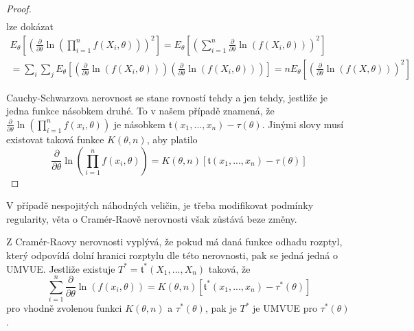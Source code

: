 \begin{proof}
\begin{gather*}
\end{gather*}
lze dokázat
\begin{gather*}
E_{\theta}\left[\left(\frac{\partial}{\partial \theta}\ln \left(\prod_{i = 1}^n f(X_i, \theta)\right) \right)^2 \right] = E_{\theta}\left[\left(\sum_{i = 1}^n \frac{\partial}{\partial \theta} \ln \left(f(X_i, \theta)\right) \right)^2\right]\\
= \sum_i \sum_j E_{\theta}\left[\left(\frac{\partial}{\partial \theta} \ln \left(f(X_i, \theta) \right)\right)\left(\frac{\partial}{\partial \theta} \ln \left(f(X_i, \theta) \right)\right)\right] = n E_{\theta}\left[\left(\frac{\partial}{\partial \theta} \ln \left(f(X, \theta)\right)\right)^2\right]
\end{gather*}

Cauchy-Schwarzova nerovnost se stane rovností tehdy a jen tehdy, jestliže je jedna funkce násobkem druhé. To v našem případě znamená, že $\frac{\partial}{\partial \theta} \ln \left(\prod_{i = 1}^n f(x_i, \theta) \right)$ je násobkem $\mathfrak{t}(x_1, ..., x_n) - \tau(\theta)$. Jinými slovy musí existovat taková funkce $K(\theta, n)$, aby platilo
\begin{equation*}
\frac{\partial}{\partial \theta} \ln \left(\prod_{i = 1}^n f(x_i, \theta) \right) = K(\theta, n)[\mathfrak{t}(x_1, ..., x_n) - \tau(\theta)]
\end{equation*}
\end{proof}

V případě nespojitých náhodných veličin, je třeba modifikovat podmínky regularity, věta o Cramér-Raově nerovnosti však zůstává beze změny.

Z Cramér-Raovy nerovnosti vyplývá, že pokud má daná funkce odhadu rozptyl, který odpovídá dolní hranici rozptylu dle této nerovnosti, pak se jedná jedná o UMVUE. Jestliže existuje $T^* = \mathfrak{t}^*(X_1, ..., X_n)$ taková, že
\begin{equation*}
\sum_{i = 1}^n \frac{\partial}{\partial \theta} \ln \left(f(x_i, \theta)\right) = K(\theta, n)[\mathfrak{t}^*(x_1, ..., x_n) - \tau^*(\theta)]
\end{equation*}
pro vhodně zvolenou funkci $K(\theta, n)$ a $\tau^*(\theta)$, pak je $T^*$ je UMVUE pro $\tau^*(\theta)$.

